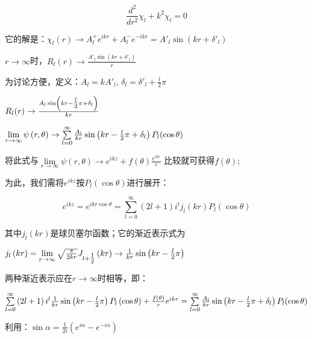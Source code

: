 \begin{equation}\label{26-10}
\frac{{d^2 }}{{dr^2 }}\chi _l  + k^2 \chi _l  = 0
\end{equation}

它的解是：$\chi _l (r) \to A_l^ +  e^{ikr}  + A_l^ -  e^{ - ikr}  = A'_l \sin \left( {kr + \delta '_l } \right)$


$r \to \infty $时，$R_l (r) \to \frac{{A'_l \sin \left( {kr + \delta '_l } \right)}}{r}$


为讨论方便，定义：$A_l  = kA'_l $, $\delta _l  = \delta '_l  + \frac{l}{2}\pi $


$R_l (r) \to \frac{{A_l \sin \left( {kr - {\textstyle{l \over 2}}\pi  + \delta _l } \right)}}{{kr}}$

$\mathop {\lim }\limits_{r \to \infty } \psi \left( {r,\theta } \right) \to \sum\limits_{l = 0}^\infty  {\frac{{A_l }}{{kr}}\sin \left( {kr - {\textstyle{l \over 2}}\pi  + \delta _l } \right)P_l (\cos \theta )} $

将此式与$\mathop {\lim }\limits_{r \to \infty } \psi \left( {r,\theta } \right) \to e^{ikz}  + f\left( \theta  \right)\frac{{e^{ikr} }}{r}$
比较就可获得$f\left( \theta  \right)$;


为此，我们需将$e^{ikz} $按$P_l \left( {\cos \theta } \right)$进行展开：


\begin{equation}\label{26-11}
e^{ikz}  = e^{ikr\cos \theta }  = \sum\limits_{l = 0}^\infty  {\left( {2l + 1} \right)i^l j_l \left( {kr} \right)P_l \left( {\cos \theta } \right)}
\end{equation}

其中$j_l \left( {kr} \right)$是球贝塞尔函数；它的渐近表示式为

$j_l \left( {kr} \right) = \mathop {\lim }\limits_{r \to \infty } \sqrt {\frac{\pi }{{2kr}}} J_{l + {\textstyle{1 \over 2}}} \left( {kr} \right) \to \frac{1}{{kr}}\sin \left( {kr - {\textstyle{l \over 2}}\pi } \right)$


两种渐近表示应在$r \to \infty $时相等，即：

$\sum\limits_{l = 0}^\infty  {\left( {2l + 1} \right)i^l \frac{1}{{kr}}\sin \left( {kr - {\textstyle{l \over 2}}\pi } \right)P_l \left( {\cos \theta } \right)}  + \frac{{f\left( \theta  \right)}}{r}e^{ikr}  = \sum\limits_{l = 0}^\infty  {\frac{{A_l }}{{kr}}\sin \left( {kr - {\textstyle{l \over 2}}\pi  + \delta _l } \right)P_l (\cos \theta )} $


利用：$\sin \alpha  = \frac{1}{{2i}}\left( {e^{i\alpha }  - e^{ - i\alpha } } \right)$


